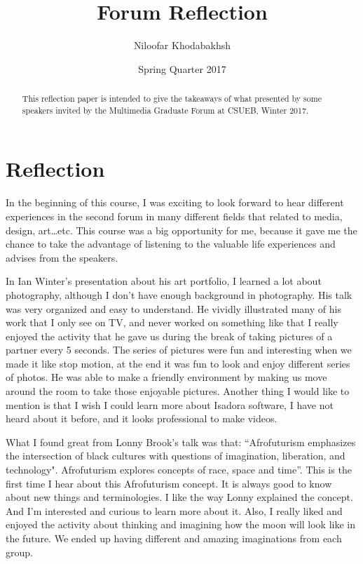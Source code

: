 \documentclass[letterpaper]{article}
\title{Forum Reflection}
\author{Niloofar Khodabakhsh}
\date{Spring Quarter 2017}
\begin{document}
\maketitle
\begin{abstract}
This reflection paper is intended to give the takeaways of what presented by some speakers invited by the Multimedia Graduate Forum at CSUEB, Winter 2017.   
\end{abstract}

\section{Reflection}

	In the beginning of this course, I was exciting to look forward to hear different experiences in the second forum in many different fields that related to media, design, art…etc. This course was a big opportunity for me, because it gave me the chance to take the advantage of listening to the valuable life experiences and advises from the speakers.

	In Ian Winter’s \parencite{LectureIan_2017}presentation about his art portfolio, I learned a lot about photography, although I don’t have enough background in photography. His talk was very organized and easy to understand. He vividly illustrated many of his work that I only see on TV, and never worked on something like that I really enjoyed the activity that he gave us during the break of taking pictures of a partner every 5 seconds. The series of pictures were fun and interesting when we made it like stop motion, at the end it was fun to look and enjoy different series of photos. He was able to make a friendly environment by making us move around the room to take those enjoyable pictures. Another thing I would like to mention is that I wish I could learn more about Isadora software, I have not heard about it before, and it looks professional to make videos.
    
	What I found great from Lonny Brook’s \parencite{LectureLonny_2017} talk was that: “Afrofuturism emphasizes the intersection of black cultures with questions of imagination, liberation, and technology". Afrofuturism explores concepts of race, space and time”. This is the first time I hear about this Afrofuturism concept. It is always good to know about new things and terminologies. I like the way Lonny explained the concept. And I’m interested and curious to learn more about it.  
Also, I really liked and enjoyed the activity about thinking and imagining how the moon will look like in the future. We ended up having different and amazing imaginations from each group.
\end{document}
